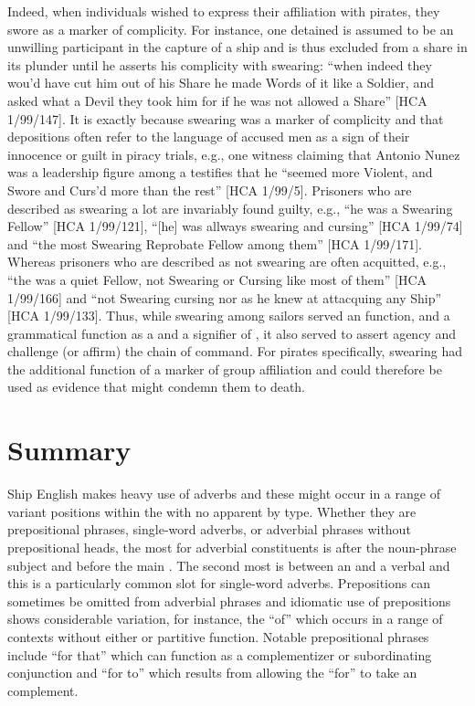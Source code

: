 Indeed, when individuals wished to express their affiliation with pirates, they swore as a marker of complicity. For instance, one detained  is assumed to be an unwilling participant in the capture of a ship and is thus excluded from a share in its plunder until he asserts his complicity with swearing: “when indeed they wou’d have cut him out of his Share he made Words of it like a Soldier, and asked what a Devil they took him for if he was not allowed a Share” [HCA 1/99/147]. It is exactly because swearing was a marker of complicity and  that depositions often refer to the language of accused men as a sign of their innocence or guilt in piracy trials, e.g., one witness claiming that Antonio Nunez was a leadership figure among a   testifies that he “seemed more Violent, and Swore and Curs’d more than the rest” [HCA 1/99/5]. Prisoners who are described as swearing a lot are invariably found guilty, e.g., “he was a Swearing Fellow” [HCA 1/99/121], “[he] was allways swearing and cursing” [HCA 1/99/74] and “the most Swearing Reprobate Fellow among them” [HCA 1/99/171]. Whereas prisoners who are described as not swearing are often acquitted, e.g., “the  was a quiet Fellow, not Swearing or Cursing like most of them” [HCA 1/99/166] and “not Swearing cursing nor as he knew at attacquing any Ship” [HCA 1/99/133]. Thus, while swearing among sailors served an  function, and a grammatical function as a  and a signifier of , it also served to assert agency and challenge (or affirm) the chain of command.  For pirates specifically, swearing had the additional function of a marker of group affiliation and could therefore be used as evidence that might condemn them to death. 

\section{{Summary}}%

Ship English makes heavy use of adverbs and these might occur in a range of variant positions within the  with no apparent  by  type. Whether they are prepositional phrases, single-word adverbs, or adverbial phrases without prepositional heads, the most  for adverbial constituents is after the noun-phrase subject and before the main . The second most  is between an  and a verbal  and this is a particularly common slot for single-word adverbs. Prepositions can sometimes be omitted from adverbial phrases and idiomatic use of prepositions shows considerable variation, for instance, the  “of” which occurs in a range of contexts without either  or partitive function. Notable prepositional phrases include “for that” which can function as a complementizer or subordinating conjunction and “for to” which results from allowing the  “for” to take an   complement. 

